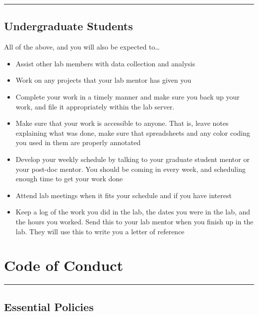 \documentclass[]{book}
\providecommand{\tightlist}{%
  \setlength{\itemsep}{0pt}\setlength{\parskip}{0pt}}
\begin{document}
\begin{center}\rule{0.5\linewidth}{0.5pt}\end{center}

\hypertarget{undergraduate-students}{%
\section{Undergraduate Students}\label{undergraduate-students}}

All of the above, and you will also be expected to\ldots{}

\begin{itemize}
\tightlist
\item
  Assist other lab members with data collection and analysis
\item
  Work on any projects that your lab mentor has given you
\item
  Complete your work in a timely manner and make sure you back up your work, and file it appropriately within the lab server.
\item
  Make sure that your work is accessible to anyone. That is, leave notes explaining what was done, make sure that spreadsheets and any color coding you used in them are properly annotated
\item
  Develop your weekly schedule by talking to your graduate student mentor or your post-doc mentor. You should be coming in every week, and scheduling enough time to get your work done
\item
  Attend lab meetings when it fits your schedule and if you have interest
\item
  Keep a log of the work you did in the lab, the dates you were in the lab, and the hours you worked. Send this to your lab mentor when you finish up in the lab. They will use this to write you a letter of reference
\end{itemize}

\hypertarget{code-of-conduct}{%
\chapter{Code of Conduct}\label{code-of-conduct}}

\begin{center}\rule{0.5\linewidth}{0.5pt}\end{center}

\hypertarget{essential-policies}{%
\section{Essential Policies}\label{essential-policies}}
\end{document}
